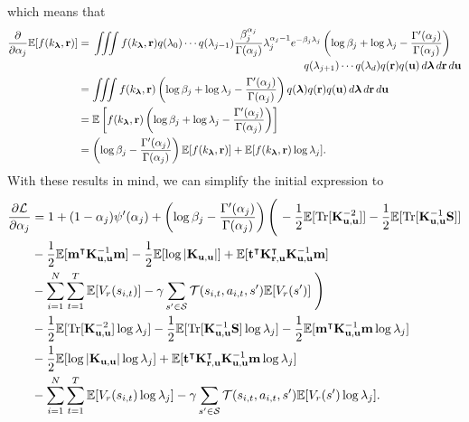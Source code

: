 \documentclass{mprop}
\theoremstyle{definition}
\DeclareMathOperator{\Tr}{Tr}
\begin{document}
which means that
\[
  \begin{split}
    \da\mathbb{E}[f(k_{\bm\lambda}, \mathbf{r})] &= \!\begin{multlined}[t]
      \iiint f(k_{\bm\lambda}, \mathbf{r}) q(\lambda_0) \cdots q(\lambda_{j-1})
      \frac{\beta_j^{\alpha_j}}{\Gamma(\alpha_j)}\lambda_j^{\alpha_j -
        1}e^{-\beta_j\lambda_j} \left(\log\beta_j + \log\lambda_j -
        \frac{\Gamma'(\alpha_j)}{\Gamma(\alpha_j)} \right) \\
      q(\lambda_{j+1}) \cdots q(\lambda_d)
      q(\mathbf{r})q(\mathbf{u})\,d\bm\lambda\,d\mathbf{r}\,d\mathbf{u}
    \end{multlined} \\
    &= \iiint f(k_{\bm\lambda}, \mathbf{r}) \left(\log\beta_j + \log\lambda_j -
      \frac{\Gamma'(\alpha_j)}{\Gamma(\alpha_j)} \right) q(\bm\lambda)
    q(\mathbf{r})q(\mathbf{u})\,d\bm\lambda\,d\mathbf{r}\,d\mathbf{u} \\
    &= \mathbb{E} \left[ f(k_{\bm\lambda}, \mathbf{r}) \left(\log\beta_j +
        \log\lambda_j - \frac{\Gamma'(\alpha_j)}{\Gamma(\alpha_j)} \right)
    \right] \\
    &= \left( \log\beta_j - \frac{\Gamma'(\alpha_j)}{\Gamma(\alpha_j)}
    \right)\mathbb{E}[f(k_{\bm\lambda}, \mathbf{r})] +
    \mathbb{E}[f(k_{\bm\lambda}, \mathbf{r})\log\lambda_j].
  \end{split}
\]
With these results in mind, we can simplify the initial expression to
\[
  \begin{split}
    \frac{\partial\mathcal{L}}{\partial\alpha_j} &= 1 + (1 -
    \alpha_j)\psi'(\alpha_j) + \left( \log\beta_j -
      \frac{\Gamma'(\alpha_j)}{\Gamma(\alpha_j)} \right)
    \left(\vphantom{\sum_{i=1}^N} \right. - \frac{1}{2}
    \mathbb{E}[\Tr[\Kuu^{-2}]] - \frac{1}{2}\mathbb{E}[\Tr[\Kuu^{-1}\mathbf{S}]]
    \\
    &- \frac{1}{2}\mathbb{E}[\mathbf{m}^\intercal\Kuu^{-1}\mathbf{m}] -
    \frac{1}{2}\mathbb{E}[\log|\Kuu|] +
    \mathbb{E}[\mathbf{t}^\intercal\Kru^\intercal\Kuu^{-1}\mathbf{m}] \\
    &- \sum_{i=1}^N \sum_{t=1}^T \mathbb{E}[V_r(s_{i,t})] - \gamma\sum_{s' \in
      \mathcal{S}} \mathcal{T}(s_{i,t}, a_{i,t}, s')\mathbb{E}[V_r(s')] \left.
      \vphantom{\sum_{i=1}^N} \right) \\
    & - \frac{1}{2}\mathbb{E}[\Tr[\Kuu^{-2}]\log\lambda_j] -
    \frac{1}{2}\mathbb{E}[\Tr[\Kuu^{-1}\mathbf{S}]\log\lambda_j] -
    \frac{1}{2}\mathbb{E}[\mathbf{m}^\intercal\Kuu^{-1}\mathbf{m}\log\lambda_j]
    \\
    &- \frac{1}{2}\mathbb{E}[\log|\Kuu|\log\lambda_j] +
    \mathbb{E}[\mathbf{t}^\intercal\Kru^\intercal\Kuu^{-1}\mathbf{m}\log\lambda_j]
    \\
    &- \sum_{i=1}^N\sum_{t=1}^T\mathbb{E}[V_r(s_{i,t})\log\lambda_j] -
    \gamma\sum_{s' \in \mathcal{S}}\mathcal{T}(s_{i,t}, a_{i,t},
    s')\mathbb{E}[V_r(s')\log\lambda_j].
  \end{split}
\]
\end{document}
